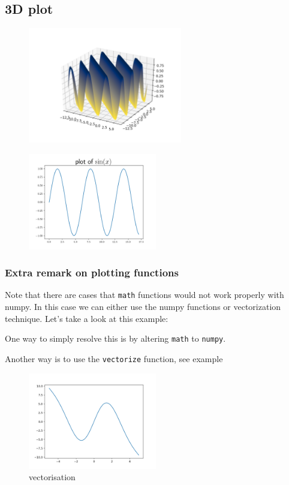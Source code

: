 \documentclass[10pt,a4paper]{article}
\newcommand{\te}{\texttt}
\begin{document}
\subsection{3D plot}

\begin{figure}[htbp]\centering
\includegraphics[width=0.6\textwidth]{3dplot.png}
\end{figure}
\begin{figure}[htbp]\centering
\includegraphics[width=0.5\textwidth]{sin.png}
\end{figure}
\subsubsection{Extra remark on plotting functions}
Note that there are cases that \te{math} functions would not work properly with numpy. In this case we can either use the numpy functions or vectorization technique. 
Let's take a look at this example:

One way to simply resolve this is by altering \te{math} to \te{numpy}.

Another way is to use the \te{vectorize} function, see example

\begin{figure}[htbp]\centering
\caption{vectorisation}
\includegraphics[width=0.5\textwidth]{vectorisation.png}
\end{figure}
\end{document}
